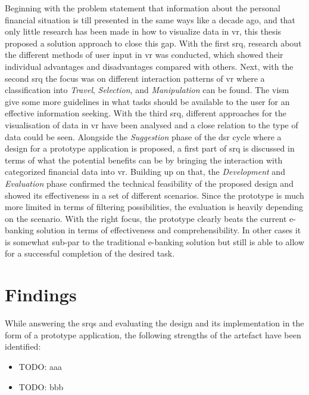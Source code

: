 Beginning with the problem statement that information about the personal financial situation is till presented in the same ways like a decade ago, and that only little research has been made in how to visualize data in \gls{vr}, this thesis proposed a solution approach to close this gap. With the first \gls{srq}, research about the different methods of user input in \gls{vr} was conducted, which showed their individual advantages and disadvantages compared with others. Next, with the second \gls{srq} the focus was on different interaction patterns of \gls{vr} where a classification into \textit{Travel}, \textit{Selection}, and \textit{Manipulation} can be found. The \gls{vism} give some more guidelines in what tasks should be available to the user for an effective information seeking. With the third \gls{srq}, different approaches for the visualisation of data in \gls{vr} have been analysed and a close relation to the type of data could be seen. Alongside the \textit{Suggestion} phase of the \gls{dsr} cycle where a design for a prototype application is proposed, a first part of \gls{srq} is discussed in terms of what the potential benefits can be by bringing the interaction with categorized financial data into \gls{vr}. Building up on that, the \textit{Development} and \textit{Evaluation} phase confirmed the technical feasibility of the proposed design and showed its effectiveness in a set of different scenarios. Since the prototype is much more limited in terms of filtering possibilities, the evaluation is heavily depending on the scenario. With the right focus, the prototype clearly beats the current e-banking solution in terms of effectiveness and comprehensibility. In other cases it is somewhat sub-par to the traditional e-banking solution but still is able to allow for a successful completion of the desired task.



\section{Findings}

While answering the \glspl{srq} and evaluating the design and its implementation in the form of a prototype application, the following strengths of the artefact have been identified:
\begin{itemize}[]
	\item TODO: aaa
	\item TODO: bbb
\end{itemize}

